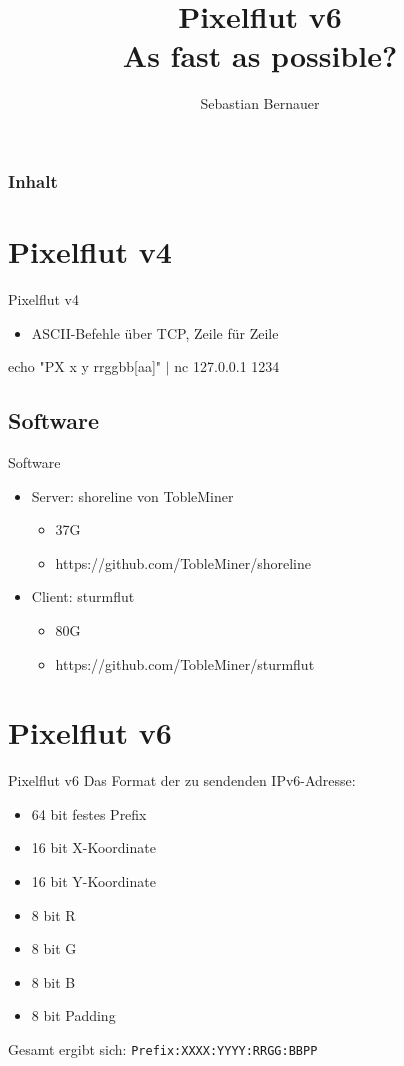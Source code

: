 \documentclass[12pt,donthandout,notes=dontshow,xcolor=table]{beamer}
\author{Sebastian Bernauer}
\title[Pixelflut v6]{Pixelflut v6\\As fast as possible?}
\begin{document}
\begin{frame}
\titlepage
\end{frame}

\begin{frame}%
\frametitle{Inhalt}
\tableofcontents
\end{frame}

\section{Pixelflut v4}
\begin{frame}{Pixelflut v4}
	\begin{itemize}
		\item ASCII-Befehle über TCP, Zeile für Zeile
	\end{itemize}
	\vfill
	\begin{tcolorbox}[title=Verwendung]
	echo "PX x y rrggbb[aa]" $\vert$ nc 127.0.0.1 1234
	\end{tcolorbox}
\end{frame}

\subsection{Software}
\begin{frame}{Software}
	\begin{itemize}
		\item Server: shoreline von TobleMiner
		\begin{itemize}
			\item 37G
			\item https://github.com/TobleMiner/shoreline
		\end{itemize}
		\item Client: sturmflut
		\begin{itemize}
			\item 80G
			\item https://github.com/TobleMiner/sturmflut
		\end{itemize}
	\end{itemize}
\end{frame}

\section{Pixelflut v6}
\begin{frame}[fragile]{Pixelflut v6}
	Das Format der zu sendenden IPv6-Adresse:
	\begin{itemize}
	\item 64 bit festes Prefix
	\item    16 bit X-Koordinate
	\item    16 bit Y-Koordinate
	\item    8 bit R
	\item    8 bit G
	\item    8 bit B
	\item    8 bit Padding
	\end{itemize}
	
	Gesamt ergibt sich: \texttt{Prefix:XXXX:YYYY:RRGG:BBPP}
\end{frame}
\end{document}

